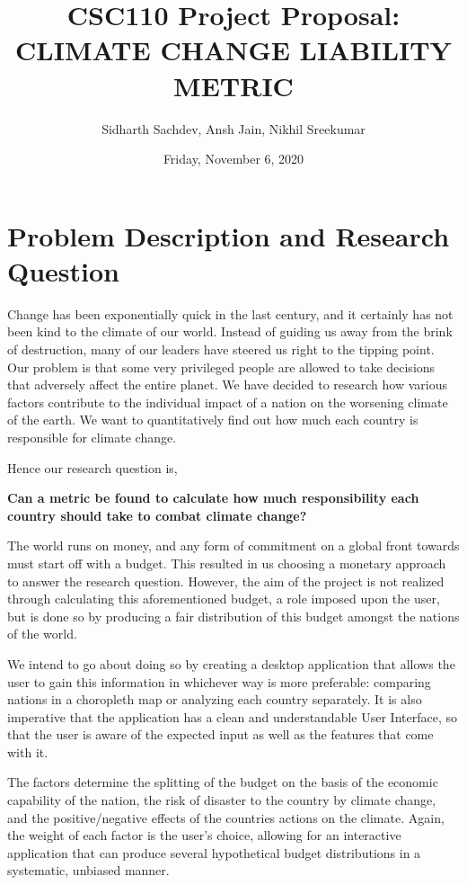 \documentclass[fontsize=11pt]{article}
\title{CSC110 Project Proposal: CLIMATE CHANGE LIABILITY METRIC}
\author{Sidharth Sachdev, Ansh Jain, Nikhil Sreekumar}
\date{Friday, November 6, 2020}
\begin{document}
\maketitle

\section*{Problem Description and Research Question}

Change has been exponentially quick in the last century, and it certainly has not been kind to the climate of our world.
Instead of guiding us away from the brink of destruction, many of our leaders have steered us right to the tipping point.
Our problem is that some very privileged people are allowed to take decisions that adversely affect the entire planet.
 We have decided to research how various factors contribute to the individual impact of a nation on the worsening climate of the earth.
We want to quantitatively find out how much each country is responsible for climate change.\newline

Hence our research question is,\newline

\textbf{Can a metric be found to calculate how much responsibility each country should take to combat climate change?} \newline

The world runs on money, and any form of commitment on a global front towards must start off with
a budget.
This resulted in us choosing a monetary approach to answer the research question.
However, the aim of the project is not realized through calculating this aforementioned budget, a role
imposed upon the user, but is done so by producing a fair distribution
of this budget amongst the nations of the world.\newline

We intend to go about doing so by creating a desktop application that allows the user to gain this information in
whichever way is more preferable: comparing nations in a choropleth map or analyzing each country separately.
It is also imperative that the application has a clean and understandable User Interface, so that the user is aware
of the expected input as well as the features that come with it.\newline

The factors determine the splitting of the budget on the basis of the economic capability of the nation, the risk of disaster to the
country by climate change, and the positive/negative effects of the countries actions on the climate.
Again, the weight of each factor is the user's choice, allowing for an interactive application that can produce several
hypothetical budget distributions in a systematic, unbiased manner.
\end{document}

